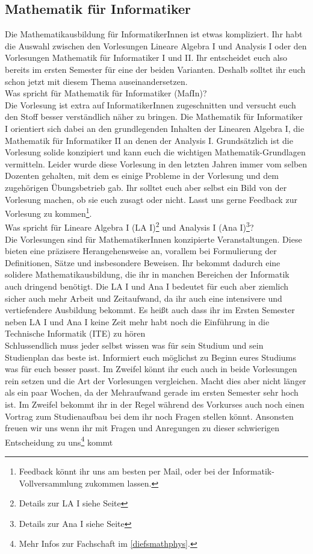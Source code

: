 \subsection{Mathematik für Informatiker}
\label{mafin}

Die Mathematikausbildung für InformatikerInnen ist etwas kompliziert. Ihr habt die Auswahl zwischen den Vorlesungen Lineare Algebra I und Analysis I oder den Vorlesungen Mathematik für Informatiker I und II. Ihr entscheidet euch also bereits im ersten Semester für eine der beiden Varianten. Deshalb solltet ihr euch schon jetzt mit diesem Thema auseinandersetzen.\\

Was spricht für Mathematik für Informatiker (MafIn)?\\
Die Vorlesung ist extra auf InformatikerInnen zugeschnitten und versucht euch den Stoff besser verständlich näher zu bringen. Die Mathematik für Informatiker I orientiert sich dabei an den grundlegenden Inhalten der Linearen Algebra I, die Mathematik für Informatiker II an denen der Analysis I. Grundsätzlich ist die Vorlesung solide konzipiert und kann euch die wichtigen Mathematik-Grundlagen vermitteln. Leider wurde diese Vorlesung in den letzten Jahren immer vom selben Dozenten gehalten, mit dem es einige Probleme in der Vorlesung und dem zugehörigen Übungsbetrieb gab. Ihr solltet euch aber selbst ein Bild von der Vorlesung machen, ob sie euch zusagt oder nicht. Lasst uns gerne Feedback zur Vorlesung zu kommen\footnote{Feedback könnt ihr uns am besten per Mail, oder bei der Informatik-Vollversammlung zukommen lassen.}.\\

Was spricht für Lineare Algebra I (LA I)\footnote{Details zur LA I siehe Seite \pageref{la1}} und Analysis I (Ana I)\footnote{Details zur Ana I siehe Seite \pageref{ana1}}?\\
Die Vorlesungen sind für MathematikerInnen konzipierte Veranstaltungen. Diese bieten eine präzisere Herangehensweise an, vorallem bei Formulierung der Definitionen, Sätze und insbesondere Beweisen. Ihr bekommt dadurch eine solidere Mathematikausbildung, die ihr in manchen Bereichen der Informatik auch dringend benötigt. Die LA I und Ana I bedeutet für euch aber ziemlich sicher auch mehr Arbeit und Zeitaufwand, da ihr auch eine intensivere und vertiefendere Ausbildung bekommt. Es heißt auch dass ihr im Ersten Semester neben LA I und Ana I keine Zeit mehr habt noch die Einführung in die Technische Informatik (ITE) zu hören\\

Schlussendlich muss jeder selbst wissen was für sein Studium und sein Studienplan das beste ist. Informiert euch möglichst zu Beginn eures Studiums was für euch besser passt. Im Zweifel könnt ihr euch auch in beide Vorlesungen rein setzen und die Art der Vorlesungen vergleichen. Macht dies aber nicht länger als ein paar Wochen, da der Mehraufwand gerade im ersten Semester sehr hoch ist. Im Zweifel bekommt ihr in der Regel während des Vorkurses auch noch einen Vortrag zum Studienaufbau bei dem ihr noch Fragen stellen könnt. Ansonsten freuen wir uns wenn ihr mit Fragen und Anregungen zu dieser schwierigen Entscheidung zu uns\footnote{Mehr Infos zur Fachschaft im \autoref{diefsmathphys}.} kommt

